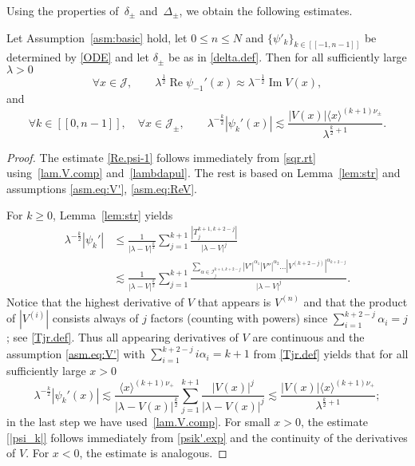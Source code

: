Using the properties of~$\delta_\pm$ and~$\Delta_\pm$,
we obtain the following estimates.
\begin{Lemma}\label{lem:exp.bound}
Let Assumption~\ref{asm:basic} hold, 
let $0 \leq n \leq N$ and $\{\psi'_k\}_{k\in[[-1,n-1]]}$ be determined by \eqref{ODE} 
and let $\delta_\pm$ be as in \eqref{delta.def}. 
Then for all sufficiently large $\lambda >0$  
\begin{equation}
\label{Re.psi-1}
\forall x \in {\mathcal J}, \qquad \lambda^\frac 12 {\operatorname{Re}}\psi_{-1}'(x) 
\approx \lambda^{-\frac12} {\operatorname{Im}} V(x),
\end{equation}
and 
\begin{equation}\label{|psi_k|}
\forall k \in [[0,n-1]], \quad \forall x \in {\mathcal J}_\pm, \qquad
\lambda^{-\frac k2} |\psi_k'(x)| 
{\lesssim} 
\frac{|V(x)|\langle x \rangle^{(k+1)\nu_\pm}}{\lambda^{\frac k2+1}} .
\end{equation}
\end{Lemma}
\begin{proof}
The estimate \eqref{Re.psi-1} follows immediately from \eqref{sqr.rt} 
using~\eqref{lam.V.comp} and~\eqref{lambdapul}.
The rest is based on Lemma~\ref{lem:str} and assumptions \eqref{asm.eq:V'}, \eqref{asm.eq:ReV}. 

For $k \geq 0$, Lemma~\ref{lem:str} yields
\begin{equation}\label{psik'.exp}
\begin{aligned}
\lambda^{-\frac k2} |\psi_k'|
&\leq 
\frac{1}{|\lambda-V|^\frac k2} \sum_{j=1}^{k+1} \frac{|T_j^{k+1,k+2-j}|}{|\lambda-V|^j}
\\
&{\lesssim} 
\frac{1}{|\lambda-V|^\frac k2}
\sum_{j=1}^{k+1}
\frac{\sum_{\alpha \in {\mathcal I}_j^{k+1,k+2-j}}  
|V'|^{\alpha_1} |V''|^{\alpha_2} \dots |V^{(k+2-j)}|^{\alpha_{k+2-j}}}{|\lambda-V|^j}.
\end{aligned}
\end{equation}
Notice that the highest derivative of $V$ that appears is $V^{(n)}$ and that the product of $|V^{(i)}|$ consists always of $j$ factors (counting with powers) since $\sum_{i=1}^{k+2-j} \alpha_i = j$; see \eqref{Tjr.def}. 
Thus all appearing derivatives of $V$ are continuous and the assumption \eqref{asm.eq:V'} with $\sum_{i=1}^{k+2-j} i \alpha_i = k+1$ from \eqref{Tjr.def} yields that for all sufficiently large $x>0$
\begin{equation}\label{psik'.est}
\lambda^{-\frac k2} |\psi_k'(x)|
{\lesssim}
\frac{\langle x \rangle^{(k+1)\nu_+}}{|\lambda-V(x)|^\frac k2} 
\sum_{j=1}^{k+1} \frac{|V(x)|^j }{|\lambda-V(x)|^j}
{\lesssim}
\frac{|V(x)| \langle x \rangle^{(k+1)\nu_+}}{\lambda^{\frac k2+1}};
\end{equation}
in the last step we have used~\eqref{lam.V.comp}.
For small $x>0$, the estimate \eqref{|psi_k|} follows immediately from \eqref{psik'.exp} and the continuity of the derivatives of $V$. For $x<0$, the estimate is analogous.
\end{proof}

